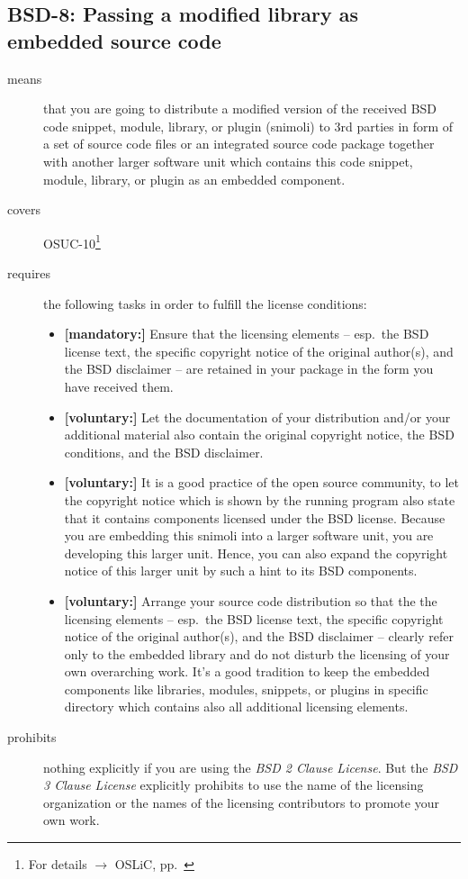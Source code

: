 \subsection{BSD-8: Passing a modified library as embedded source code}
\label{OSUC-10-BSD}
\begin{description}
\item[means] that you are going to distribute a modified version of the received
BSD code snippet, module, library, or plugin (snimoli) to 3rd parties in form
of a set of source code files or an integrated source code package together with
another larger software unit which contains this code snippet, module, library,
or plugin as an embedded component.
\item[covers] OSUC-10\footnote{For details $\rightarrow$ OSLiC, pp.\ \pageref{OSUC-10-DEF}}
\item[requires] the following tasks in order to fulfill the license conditions:
\begin{itemize}
  \item \textbf{[mandatory:]} Ensure that the licensing elements -- esp.\ the
  BSD license text, the specific copyright notice of the original author(s), and
  the BSD disclaimer -- are retained in your package in the form you have
  received them.
  \item \textbf{[voluntary:]} Let the documentation of your distribution
  and/or your additional material also contain the original copyright notice, the
  BSD conditions, and the BSD disclaimer.
 \item \textbf{[voluntary:]} It is a good practice of the open source
  community, to let the copyright notice which is shown by the running program
  also state that it contains components licensed under the BSD license. Because
  you are embedding this snimoli into a larger software unit, you are
  developing this larger unit. Hence, you can also expand the copyright notice
  of this larger unit by such a hint to its BSD components.
  
  \item \textbf{[voluntary:]} Arrange your source code distribution so that the
  the licensing elements -- esp.\ the BSD license text, the specific copyright
  notice of the original author(s), and the BSD disclaimer -- clearly refer
  only to the embedded library and do not disturb the licensing of your own
  overarching work. It's a good tradition to keep the embedded components like
  libraries, modules, snippets, or plugins in specific directory which contains
  also all additional licensing elements.
  
\end{itemize}

\item[prohibits] nothing explicitly if you are using the \emph{BSD 2 Clause
License}. But the \emph{BSD 3 Clause License} explicitly prohibits to use the
name of the licensing organization or the names of the licensing contributors to
promote your own work.

\end{description}


